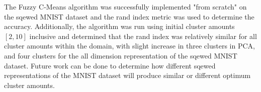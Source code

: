 The Fuzzy C-Means algorithm was successfully implemented "from scratch" on the sqewed MNIST dataset and the rand index metric was used to determine the accuracy. Additionally, the algorithm was run using initial cluster amounts $[2,10]$ inclusive and determined that the rand index was relatively similar for all cluster amounts within the domain, with slight increase in three clusters in PCA, and four clusters for the all dimension representation of the sqewed MNIST dataset. Future work can be done to determine how different sqewed representations of the MNIST dataset will produce similar or different optimum cluster amounts.
